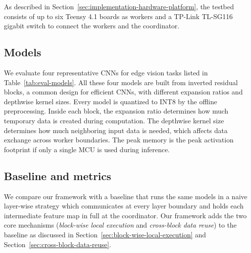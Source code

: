 As described in Section~\ref{sec:implementation-hardware-platform}, the testbed consists of up to six Teensy 4.1 boards as workers and a TP-Link TL-SG116 gigabit switch to connect the workers and the coordinator. 

\subsection{Models}
\begin{table}[b]
    \caption{Evaluated models. All weights and activations are quantized to INT8 and stored in Flash and SRAM.}
    \label{tab:eval-models}
    \centering
    \setlength{\tabcolsep}{8pt}
\end{table}

We evaluate four representative CNNs for edge vision tasks listed in Table~\ref{tab:eval-models}. All these four models are built from inverted residual blocks, a common design for efficient CNNs, with different expansion ratios and depthwise kernel sizes. Every model is quantized to INT8 by the offline preprocessing. 
Inside each block, the expansion ratio determines how much temporary data is created during computation. The depthwise kernel size determines how much neighboring input data is needed, which affects data exchange across worker boundaries.
The peak memory is the peak activation footprint if only a single MCU is used during inference.

\subsection{Baseline and metrics}
We compare our framework with a baseline that runs the same models in a naive layer-wise strategy which communicates at every layer boundary and holds each intermediate feature map in full at the coordinator. Our framework adds the two core mechanisms (\emph{block-wise local execution} and \emph{cross-block data reuse}) to the baseline as discussed in Section~\ref{sec:block-wise-local-execution} and Section~\ref{sec:cross-block-data-reuse}.

